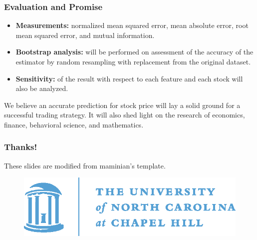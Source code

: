 \documentclass{beamer}
\begin{document}
\begin{frame}
\frametitle{Evaluation and Promise}

\begin{itemize}
\item \textbf{Measurements:} normalized mean squared error, mean absolute error, root mean squared error, and mutual information.\\
\item \textbf{Bootstrap analysis:}  will be performed on assessment of the accuracy of the estimator by random resampling with replacement from the original dataset.
\item \textbf{Sensitivity:} of the result with respect to each feature and each stock will also be analyzed.
\end{itemize}

\vspace{2em}
\setlength\parindent{20pt}
We believe an accurate prediction for stock price will lay a solid ground for a successful trading strategy. It will also shed light on the research of economics, finance, behavioral science, and mathematics.

\end{frame}
%
\begin{frame}
\frametitle{Thanks!}

These slides are modified from maminian's template\cite{UNCbeamer}.
\vspace{1em}

%


\begin{figure}
\centering
\includegraphics[width=0.5\linewidth]{oldwell_cmyk}
\end{figure}
\end{frame}
%
\end{document}
